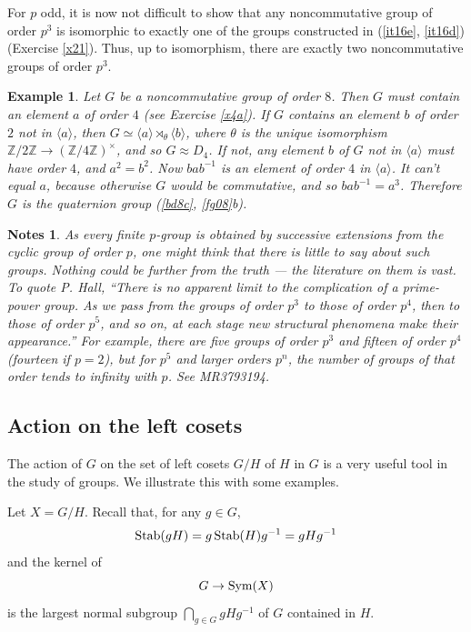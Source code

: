 \documentclass[a4paper,11pt,final]{memoir}%
\newtheorem{example}[X]{Example}
\newtheorem*{nt}{Notes}
\theoremstyle{nonumberplain}
\begin{document}
For $p$ odd, it is now not difficult to show that any noncommutative group of
order $p^{3}$ is isomorphic to exactly one of the groups constructed in
(\ref{it16e}, \ref{it16d}) (Exercise \ref{x21}). Thus, up to isomorphism,
there are exactly two noncommutative groups of order $p^{3}$.

\begin{example}
\label{ga18e}Let $G$ be a noncommutative group of order $8$. Then $G$ must
contain an element $a$ of order $4$ (see Exercise \ref{x4a}). If $G$ contains
an element $b$ of order $2$ not in $\langle a\rangle$, then $G\simeq\langle
a\rangle\rtimes_{\theta}\langle b\rangle$, where $\theta$ is the unique
isomorphism $\mathbb{Z}{}/2\mathbb{Z}{}\rightarrow(\mathbb{Z}{}/4\mathbb{Z}%
{})^{\times}$, and so $G\approx D_{4}$. If not, any element $b$ of $G$ not in
$\langle a\rangle$ must have order $4$, and $a^{2}=b^{2}$. Now $bab^{-1}$ is
an element of order $4$ in $\langle a\rangle$. It can't equal $a$, because
otherwise $G$ would be commutative, and so $bab^{-1}=a^{3}$. Therefore $G$ is
the quaternion group (\ref{bd8c}, \ref{fg08}b).
\end{example}

\begin{nt}
As every finite $p$-group is obtained by successive extensions from the cyclic
group of order $p$, one might think that there is little to say about such
groups. Nothing could be further from the truth --- the literature on them is
vast. To quote P. Hall, ``There is no apparent limit to the complication of a
prime-power group. As we pass from the groups of order $p^{3}$ to those of
order $p^{4}$, then to those of order $p^{5}$, and so on, at each stage new
structural phenomena make their appearance.'' For example, there are five
groups of order $p^{3}$ and fifteen of order $p^{4}$ (fourteen if $p=2$), but
for $p^{5}$ and larger orders $p^{n}$, the number of groups of that order
tends to infinity with $p$. See MR3793194.
\end{nt}

\subsection{Action on the left cosets}

The action of $G$ on the set of left cosets $G/H$ of $H$ in $G$ is a very
useful tool in the study of groups. We illustrate this with some examples.

Let $X=G/H$. Recall that, for any $g\in G$,
\[
\Stab(gH)=g\Stab(H)g^{-1}=gHg^{-1}%
\]
and the kernel of
\[
G\rightarrow\operatorname{Sym}(X)
\]
is the largest normal subgroup $\bigcap_{g\in G}gHg^{-1}$ of $G$ contained in
$H$.
\end{document}
